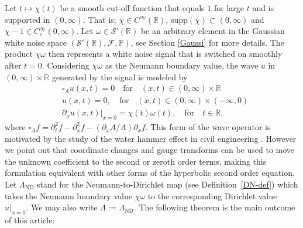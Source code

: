 \documentclass[10pt,a4paper]{article}
\theoremstyle{plain}
\theoremstyle{definition}
\theoremstyle{remark}
\numberwithin{equation}{section}
\newcommand{\R}{\mathbb{R}}
\newcommand{\ND}{\Lambda_{\text{ND}}}
\begin{document}
Let  $t \mapsto \chi(t)$ be a smooth cut-off function that equals $1$ for large $t$ and is supported in $(0,\infty)$. 
That is; $\chi \in C^\infty( \R) $, $\text{supp} (\chi) \subset (0,\infty)$ and  $\chi-1 \in C^\infty_c(0,\infty)$. 
Let $\omega \in \mathcal{S}'(\R)$ be an arbitrary element in the Gaussian white noise space $(\mathcal{S}'(\R), \mathcal{F}, \mathbb{P})$,
see Section \ref{Gaussi} for more details. 
The product $\chi \omega$ then represents a white noise signal that is switched on smoothly after $t=0$. 
Considering $\chi \omega$ as the Neumann boundary value, 
the wave $u$ in $(0,\infty) \times \R$ generated by the signal is modeled by
\begin{align}
&\square_A u (x,t) = 0 \quad \text{for} \quad (x,t) \in  (0,\infty) \times  \R \label{th-ibvp1}  \\
&u(x,t)  = 0 ,  \quad \text{for}  \quad (x,t) \in  (0,\infty)\times (-\infty,0) \label{th-ibvp2} \\
&\partial_x u (x,t) \big|_{x  = 0}  = \chi(t)\omega(t) , \quad \text{for}  \quad t \in \R,  \label{th-ibvp4}
\end{align}
where $\square_A f = \partial_t^2 f - \partial_x^2 f - (\partial_x A / A) \partial_x f$. { This form of the wave operator is motivated by the study of the water hammer effect in civil engineering \cite{wylie93_fluid_trans_system,ghidaoui05_review_water_hammer_theor_pract}. However we point out that coordinate changes and gauge transforms can be used to move the unknown coefficient to the second or zeroth order terms, making this formulation equivalent with other forms of the hyperbolic second order equation.} Let $ \ND $ stand for the Neumann-to-Dirichlet map (see Definition~\ref{DN-def}) which takes the Neumann boundary value $\chi \omega$ to the corresponding Dirichlet value $u|_{x=0}$. We may also write $\Lambda := \ND$. 
The following theorem is the main outcome of this article:
\end{document}

